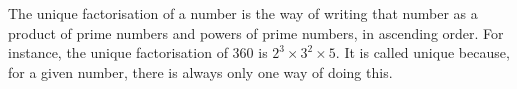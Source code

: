 The unique factorisation of a number is the way of writing that
number as a product of prime numbers and powers of prime numbers, in
ascending order. For instance, the unique factorisation of 360 is
$2^{3} \times 3^{2} \times 5.$
It is called unique because, for a given number, there is always
only one way of doing this.